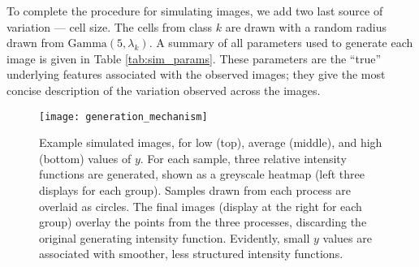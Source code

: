 To complete the procedure for simulating images, we add two last source of
variation — cell size. The cells from class $k$ are drawn with a random radius
drawn from $\text{Gamma}\left(5, \lambda_{k}\right)$. A summary of all
parameters used to generate each image is given in Table \ref{tab:sim_params}.
These parameters are the ``true'' underlying features associated with the
observed images; they give the most concise description of the variation
observed across the images.

\begin{figure}
  \centering
  \texttt{[image: generation\_mechanism]}
  \caption{Example simulated images, for low (top), average (middle), and high
    (bottom) values of $y$. For each sample, three relative intensity functions
    are generated, shown as a greyscale heatmap (left three displays for each
    group). Samples drawn from each process are overlaid as circles. The final
    images (display at the right for each group) overlay the points from the
    three processes, discarding the original generating intensity function.
    Evidently, small $y$ values are associated with smoother, less structured
    intensity functions.}
  \label{fig:matern_example}
\end{figure}

